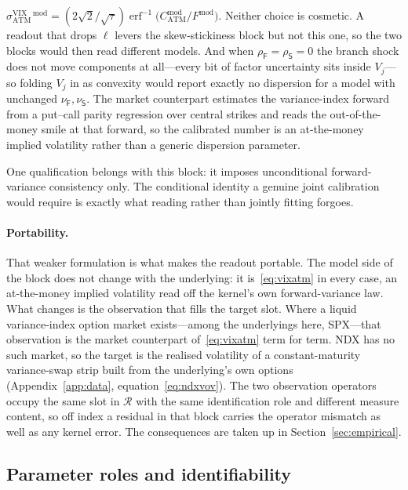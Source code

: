 \documentclass[11pt]{article}
\newcommand{\ivVIX}{\sigma^{\mathrm{VIX}}_{\mathrm{ATM}}}
\providecommand{\1}{\mathbf 1}
\begin{document}
$\ivVIX{}^{\,\mathrm{mod}}
 =(2\sqrt2/\sqrt{\tau})\operatorname{erf}^{-1}
   \bigl(C^{\mathrm{mod}}_{\mathrm{ATM}}/F^{\mathrm{mod}}\bigr)$.
Neither choice is cosmetic. A readout that drops $\ell$ levers the skew-stickiness block but not
this one, so the two blocks would then read different models. And when
$\rho_{\mathsf F}=\rho_{\mathsf S}=0$ the branch shock does not move components at all---every bit
of factor uncertainty sits inside $V_j$---so folding $V_j$ in as convexity would report exactly no
dispersion for a model with unchanged $\nu_{\mathsf F},\nu_{\mathsf S}$.
The market counterpart estimates the variance-index forward from a put--call parity regression over
central strikes and reads the out-of-the-money smile at that forward, so the calibrated
number is an at-the-money implied volatility rather than a generic dispersion parameter.

One qualification belongs with this block: it imposes unconditional forward-variance consistency
only. The conditional identity a genuine joint calibration would require is exactly what reading
rather than jointly fitting forgoes.

\paragraph{Portability.} That weaker formulation is what makes the readout portable. The model
side of the block does not change with the underlying: it is~\eqref{eq:vixatm} in every case, an
at-the-money implied volatility read off the kernel's own forward-variance law. What changes
is the observation that fills the target slot. Where a liquid variance-index option market
exists---among the underlyings here, SPX---that observation is the market counterpart
of~\eqref{eq:vixatm} term for term. NDX has no such market, so the target is the realised volatility
of a constant-maturity variance-swap strip built from the underlying's own options
(Appendix~\ref{app:data}, equation~\eqref{eq:ndxvov}). The two observation operators occupy the same
slot in $\mathcal{R}$ with the same identification role and different measure content, so off index a
residual in that block carries the operator mismatch as well as any kernel error. The consequences
are taken up in Section~\ref{sec:empirical}.

\subsection{Parameter roles and identifiability}
\end{document}
